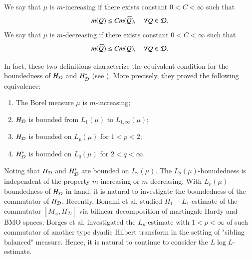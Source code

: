\documentclass[leqno]{amsart}
\begin{document}
\begin{definition}
We say that $\mu$ is $m$-increasing if there exists constant $0<C<\infty$ such that
$$m(Q)\leq Cm(\widehat{Q}),\quad \forall  Q\in{\mathcal D}.$$
We say that $\mu$ is $m$-decreasing if there exists constant $0<C<\infty$ such that
$$m(\widehat{Q})\leq C m(Q),\quad \forall Q\in{\mathcal D}.$$
\end{definition}
In fact, these two definitions characterize the equivalent condition for the boundedness of $H_{{\mathcal D}}$ and $H_{{\mathcal D}}^{*}$ (see \cite[Theorem 2.5]{LMP2014}).
More precisely, they proved the following equivalence:
\begin{enumerate}[{\rm (i)}]
	\item The Borel measure $\mu$ is $m$-increasing;
	\item $H_{{\mathcal D}}$ is bounded from $L_{1}(\mu)$ to $L_{1,\infty}(\mu)$;
	\item $H_{{\mathcal D}}$ is bounded on $L_{p}(\mu)$ for $1<p<2$;
	\item  $H_{{\mathcal D}}^{*}$ is bounded on $L_{q}(\mu)$ for $2<q<\infty$.
\end{enumerate}
Noting that $H_{{\mathcal D}}$ and $H_{{\mathcal D}}^{*}$ are bounded on $L_{2}(\mu)$. The $L_{2}(\mu)$-boundedness is independent of the property $m$-increasing or $m$-decreasing. With $L_{p}(\mu)$-boundedness of $H_{{\mathcal D}}$ in hand, it is natural to investigate the boundedness of the commutator of $H_{{\mathcal D}}$.
Recently, Bonami et al. \cite{BJXYZ2023} studied $H_1-L_1$ estimate of the commutator $[M_{\varphi}, H_{\mathcal{D}}]$ via bilinear decomposition of martingale Hardy and BMO spaces; Borges et al. \cite{BCPW2024} investigated the $L_p$-estimate with $1<p<\infty$ of such commutator of another type dyadic Hilbert transform in the setting of "sibling balanced" measure. Hence, it is natural to continue to consider the $L\log L$-estimate. 
\end{document}
